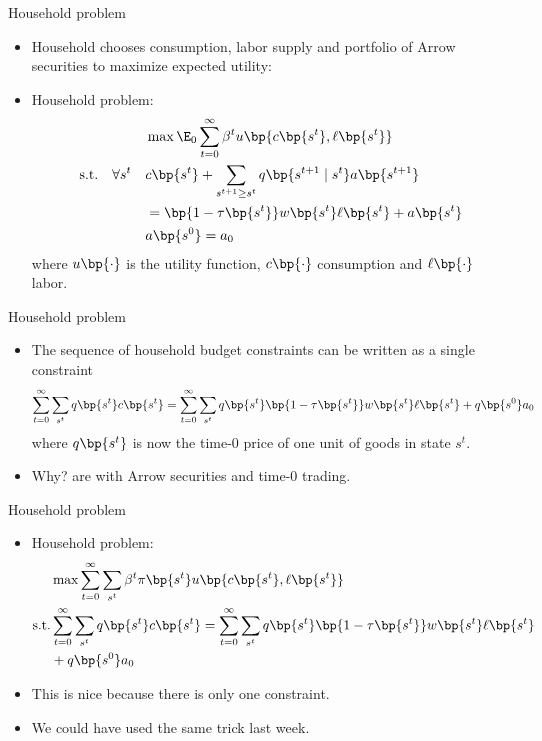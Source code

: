 \documentclass[11pt,xcolor={dvipsnames},hyperref={pdftex,pdfpagemode=UseNone,hidelinks,pdfdisplaydoctitle=true},usepdftitle=false]{beamer}
\begin{document}
    \begin{frame}{Household problem}
    \begin{itemize}
    \item Household chooses consumption, labor supply and portfolio of Arrow securities to maximize expected utility:
    \item Household problem:
    \begin{align*}  
        &\max \E_0 \sum_{t=0}^\infty  \beta^t u\bp{c \bp{s^t},\ell\bp{s^t}}\\
        \text{s.t.} \quad \forall s^t \quad & c\bp{s^t}  + \sum_{s^{t+1} \geq  s^t} q\bp{s^{t+1}\mid s^t} a \bp{s^{t+1}} \\ &=\bp{1 - \tau\bp{s^t} }w \bp{s^t} \ell\bp{s^t} + a \bp{s^{t}}  \\
        & a \bp{s^0}  = a_0 
        \end{align*}
        where $u\bp{\cdot}$ is the utility function, $c\bp{\cdot}$ consumption and $\ell \bp{\cdot}$ labor.
          \end{itemize}
    \end{frame}


    \begin{frame}{Household problem}
    \begin{itemize}
    \item The sequence of household budget constraints can be written as a single constraint
    \begin{align*}  
    \sum_{t=0}^\infty \sum_{s^t}  q\bp{s^t} c\bp{s^t}  =
    \sum_{t=0}^\infty \sum_{s^t}  q\bp{s^t} \bp{1 - \tau\bp{s^t} }w \bp{s^t} \ell\bp{s^t} +q\bp{s^0} a_0 
    \end{align*}
    where $q\bp{s^t}$ is now the time-0 price of one unit of goods in state $s^t$.
    \item Why?  are  with Arrow securities and time-0 trading.
        \end{itemize}
    \end{frame}

    \begin{frame}{Household problem}
    \begin{itemize}
    \item Household problem:
    \begin{align*}  
        & \max \sum_{t=0}^\infty \sum_{s^t}  \beta^t \pi\bp{s^t} u\bp{c \bp{s^t},\ell\bp{s^t}}\\
        \text{s.t.} & \sum_{t=0}^\infty \sum_{s^t}  q\bp{s^t} c\bp{s^t}  =
        \sum_{t=0}^\infty \sum_{s^t}  q\bp{s^t} \bp{1 - \tau\bp{s^t} }w \bp{s^t} \ell\bp{s^t} \\ &  + q\bp{s^0}a_0 
        \end{align*}
        \item This is nice because there is only one constraint. 
        \item We could have used the same trick last week. 
            \end{itemize}
    \end{frame}
\end{document}
